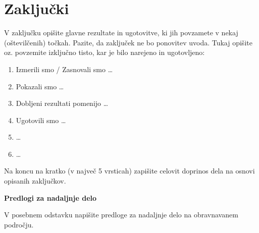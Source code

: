 \chapter{Zaključki}\label{cha:zakljucki}

V zaključku opišite glavne rezultate in ugotovitve, ki jih povzamete v nekaj (oštevilčenih) točkah. Pazite, da zaključek ne bo ponovitev uvoda. Tukaj opišite oz. povzemite izključno tisto, kar je bilo narejeno in ugotovljeno:
\begin{enumerate}
\item Izmerili smo / Zasnovali smo \ldots
\item Pokazali smo \ldots
\item Dobljeni rezultati pomenijo \ldots
\item Ugotovili smo \ldots
\item \ldots
\item \ldots
\end{enumerate}

Na koncu na kratko (v največ 5 vrsticah) zapišite celovit doprinos dela na osnovi opisanih zaključkov.

\textbf{Predlogi za nadaljnje delo}

V posebnem odstavku napišite predloge za nadaljnje delo na obravnavanem področju.
